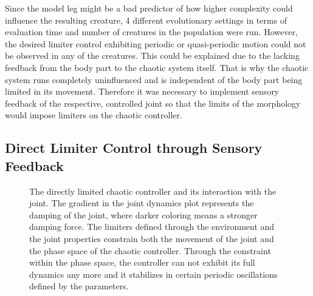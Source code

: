 \documentclass[main]{subfiles}
\begin{document}
Since the model leg might be a bad predictor of how higher complexity could influence the resulting creature, 4 different evolutionary settings in terms of evaluation time and number of creatures in the population were run. %
%
However, the desired limiter control exhibiting periodic or quasi-periodic motion could not be observed in any of the creatures. %
%
This could be explained due to the lacking feedback from the body part to the chaotic system itself. %
%
That is why the chaotic system runs completely uninfluenced and is independent of the body part being limited in its movement. %
%
Therefore it was necessary to implement sensory feedback of the respective, controlled joint so that the limits of the morphology would impose limiters on the chaotic controller.

\subsection{Direct Limiter Control through Sensory Feedback}

\begin{figure}[H]


\caption[The directly limited chaotic controller and joint complex]{The directly limited chaotic controller and its interaction with the joint. The gradient in the joint dynamics plot represents the damping of the joint, where darker coloring means a stronger damping force. The limiters defined through the environment and the joint properties constrain both the movement of the joint and the phase space of the chaotic controller. Through the constraint within the phase space, the controller can not exhibit its full dynamics any more and it stabilizes in certain periodic oscillations defined by the parameters.}
\label{figure:direct-limit-controller-joint-complex}
\end{figure}
\end{document}
